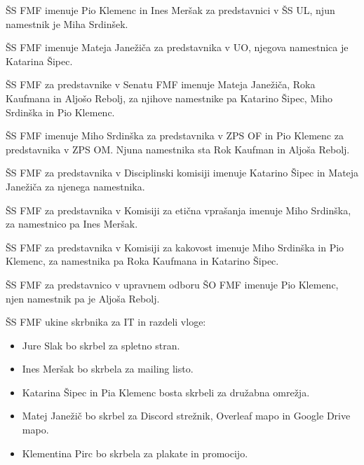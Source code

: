 \documentclass{seja}
\begin{document}
\begin{ad}
	\begin{sklep*}
		ŠS FMF imenuje Pio Klemenc in Ines Meršak za predstavnici v ŠS UL, njun namestnik je Miha Srdinšek.
	\end{sklep*}

	\begin{sklep*}
		ŠS FMF imenuje Mateja Janežiča za predstavnika v UO, njegova namestnica je Katarina Šipec.
	\end{sklep*}

	\begin{sklep*}
		ŠS FMF za predstavnike v Senatu FMF imenuje Mateja Janežiča, Roka Kaufmana in Aljošo Rebolj, za njihove namestnike pa Katarino Šipec, Miho Srdinška in Pio Klemenc.
	\end{sklep*}

	\begin{sklep*}
		ŠS FMF imenuje Miho Srdinška za predstavnika v ZPS OF in Pio Klemenc za predstavnika v ZPS OM. Njuna namestnika sta Rok Kaufman in Aljoša Rebolj.
	\end{sklep*}

	\begin{sklep*}
		ŠS FMF za predstavnika v Disciplinski komisiji imenuje Katarino Šipec in Mateja Janežiča za njenega namestnika.
	\end{sklep*}

	\begin{sklep*}
		ŠS FMF za predstavnika v Komisiji za etična vprašanja imenuje Miho Srdinška, za namestnico pa Ines Meršak.
	\end{sklep*}

	\begin{sklep*}
		ŠS FMF za predstavnika v Komisiji za kakovost imenuje Miho Srdinška in Pio Klemenc, za namestnika pa Roka Kaufmana in Katarino Šipec.
	\end{sklep*}

	\begin{sklep*}
		ŠS FMF za predstavnico v upravnem odboru ŠO FMF imenuje Pio Klemenc, njen namestnik pa je Aljoša Rebolj.
	\end{sklep*}

	\begin{sklep*}
		ŠS FMF ukine skrbnika za IT in razdeli vloge:
		\begin{itemize}
			\item
			Jure Slak bo skrbel za spletno stran.
			\item
			Ines Meršak bo skrbela za mailing listo.
			\item
			Katarina Šipec in Pia Klemenc bosta skrbeli za družabna omrežja.
			\item
			Matej Janežič bo skrbel za Discord strežnik, Overleaf mapo in Google Drive mapo.
			\item
			Klementina Pirc bo skrbela za plakate in promocijo.
			\end{itemize}
	\end{sklep*}


\end{ad}
\end{document}
